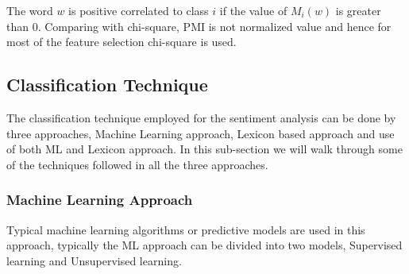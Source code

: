 \documentclass[sigconf]{acmart}
\begin{document}
The word $w$ is positive correlated to class $i$ if the value of $M_i(w)$ is greater than 0. Comparing with chi-square, PMI is not normalized value and hence for most of the feature selection chi-square is used.

\subsection{Classification Technique}

The classification technique employed for the sentiment analysis can be done by three approaches, Machine Learning approach, Lexicon based approach and use of both ML and Lexicon approach. In this sub-section we will walk through some of the techniques followed in all the three approaches.

\subsubsection{Machine Learning Approach}
Typical machine learning algorithms or predictive models are used in this approach, typically the ML approach can be divided into two models, Supervised learning and Unsupervised learning. 
\end{document}
